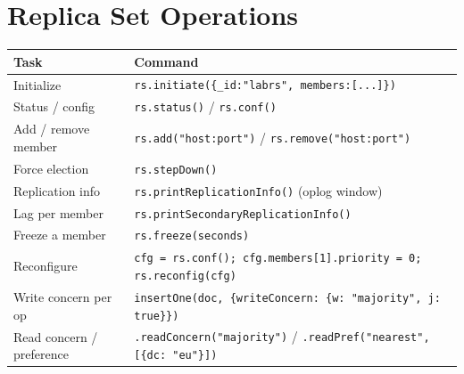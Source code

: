 \section{Replica Set Operations}
%
\begin{center}
\footnotesize
\begin{tabular}{@{}p{5.4cm}p{7.4cm}@{}}
\toprule
\textbf{Task} & \textbf{Command} \\
\midrule
Initialize & \texttt{rs.initiate(\{\_id:"labrs", members:[...]\})} \\
Status / config & \texttt{rs.status()} / \texttt{rs.conf()} \\
Add / remove member & \texttt{rs.add("host:port")} / \texttt{rs.remove("host:port")} \\
Force election & \texttt{rs.stepDown()} \\
Replication info & \texttt{rs.printReplicationInfo()} (oplog window) \\
Lag per member & \texttt{rs.printSecondaryReplicationInfo()} \\
Freeze a member & \texttt{rs.freeze(seconds)} \\
Reconfigure & \texttt{cfg = rs.conf(); cfg.members[1].priority = 0; rs.reconfig(cfg)} \\
Write concern per op & \texttt{insertOne(doc, \{writeConcern: \{w: "majority", j: true\}\})} \\
Read concern / preference & \texttt{.readConcern("majority")} / \texttt{.readPref("nearest", [\{dc: "eu"\}])} \\
\bottomrule
\end{tabular}
\end{center}

